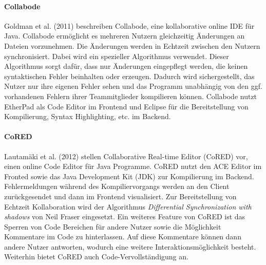 \paragraph{Collabode}
Goldman et al. (2011) \cite{goldman_real-time_2011} beschreiben Collabode, eine kollaborative online IDE für Java. Collabode ermöglicht es mehreren Nutzern gleichzeitig Änderungen an Dateien vorzunehmen. Die Änderungen werden in Echtzeit zwischen den Nutzern synchronisiert. Dabei wird ein spezieller Algorithmus verwendet. Dieser Algorithmus sorgt dafür, dass nur Änderungen eingepflegt werden, die keinen syntaktischen Fehler beinhalten oder erzeugen. Dadurch wird sichergestellt, das Nutzer nur ihre eigenen Fehler sehen und das Programm unabhängig von den ggf. vorhandenen Fehlern ihrer Teammitglieder kompilieren können. Collabode nutzt EtherPad \cite{noauthor_etherpad_nodate} als Code Editor im Frontend und Eclipse \cite{noauthor_eclipse_nodate} für die Bereitstellung von Kompilierung, Syntax Highlighting, etc. im Backend. 

\paragraph{CoRED}
Lautamäki et al. (2012) \cite{lautamaki_cored_2012} stellen Collaborative Real-time Editor (CoRED) vor, einen online Code Editor für Java Programme. CoRED nutzt den ACE Editor \cite{noauthor_ace_nodate} im Fronted sowie das Java Development Kit (JDK)  zur Kompilierung im Backend. Fehlermeldungen während des Kompiliervorgangs werden an den Client zurückgesendet und dann im Frontend visualisiert. Zur Bereitstellung von Echtzeit Kollaboration wird der Algorithmus \textit{Differential Synchronization with shadows} \cite{fraser_differential_2009} von Neil Fraser eingesetzt. Ein weiteres Feature von CoRED ist das Sperren von Code Bereichen für andere Nutzer sowie die Möglichkeit Kommentare im Code zu hinterlassen. Auf diese Kommentare können dann andere Nutzer antworten, wodurch eine weitere Interaktionsmöglichkeit besteht. Weiterhin bietet CoRED auch Code-Vervollständigung an. 

